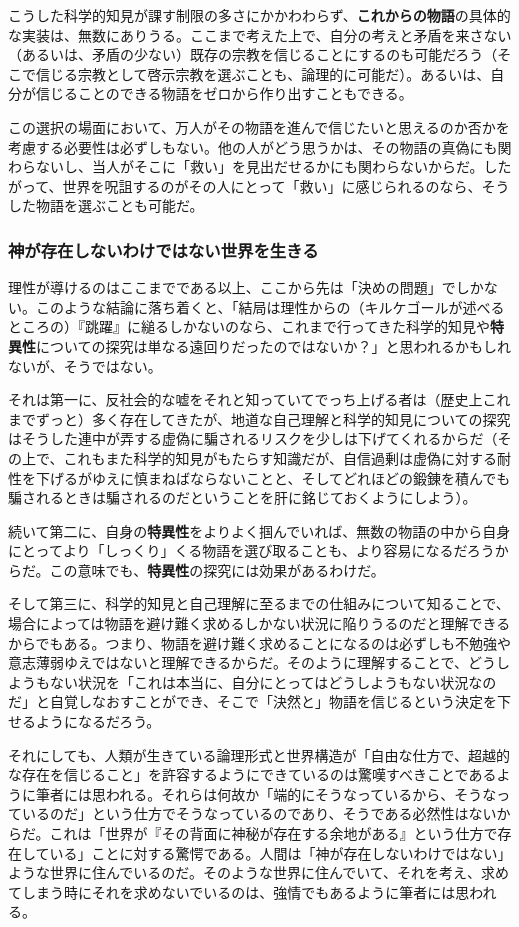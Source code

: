 こうした科学的知見が課す制限の多さにかかわわらず、\textbf{これからの物語}の具体的な実装は、無数にありうる。ここまで考えた上で、自分の考えと矛盾を来さない（あるいは、矛盾の少ない）既存の宗教を信じることにするのも可能だろう（そこで信じる宗教として啓示宗教を選ぶことも、論理的に可能だ）。あるいは、自分が信じることのできる物語をゼロから作り出すこともできる。

この選択の場面において、万人がその物語を進んで信じたいと思えるのか否かを考慮する必要性は必ずしもない。他の人がどう思うかは、その物語の真偽にも関わらないし、当人がそこに「救い」を見出だせるかにも関わらないからだ。したがって、世界を呪詛するのがその人にとって「救い」に感じられるのなら、そうした物語を選ぶことも可能だ。

\subsubsection{神が存在しないわけではない世界を生きる}\label{ux795eux304cux5b58ux5728ux3057ux306aux3044ux308fux3051ux3067ux306fux306aux3044ux4e16ux754cux3092ux751fux304dux308b}

理性が導けるのはここまでである以上、ここから先は「決めの問題」でしかない。このような結論に落ち着くと、「結局は理性からの（キルケゴールが述べるところの）『跳躍』に縋るしかないのなら、これまで行ってきた科学的知見や\textbf{特異性}についての探究は単なる遠回りだったのではないか？」と思われるかもしれないが、そうではない。

それは第一に、反社会的な嘘をそれと知っていてでっち上げる者は（歴史上これまでずっと）多く存在してきたが、地道な自己理解と科学的知見についての探究はそうした連中が弄する虚偽に騙されるリスクを少しは下げてくれるからだ（その上で、これもまた科学的知見がもたらす知識だが、自信過剰は虚偽に対する耐性を下げるがゆえに慎まねばならないことと、そしてどれほどの鍛錬を積んでも騙されるときは騙されるのだということを肝に銘じておくようにしよう）。

続いて第二に、自身の\textbf{特異性}をよりよく掴んでいれば、無数の物語の中から自身にとってより「しっくり」くる物語を選び取ることも、より容易になるだろうからだ。この意味でも、\textbf{特異性}の探究には効果があるわけだ。

そして第三に、科学的知見と自己理解に至るまでの仕組みについて知ることで、場合によっては物語を避け難く求めるしかない状況に陥りうるのだと理解できるからでもある。つまり、物語を避け難く求めることになるのは必ずしも不勉強や意志薄弱ゆえではないと理解できるからだ。そのように理解することで、どうしようもない状況を「これは本当に、自分にとってはどうしようもない状況なのだ」と自覚しなおすことができ、そこで「決然と」物語を信じるという決定を下せるようになるだろう。

それにしても、人類が生きている論理形式と世界構造が「自由な仕方で、超越的な存在を信じること」を許容するようにできているのは驚嘆すべきことであるように筆者には思われる。それらは何故か「端的にそうなっているから、そうなっているのだ」という仕方でそうなっているのであり、そうである必然性はないからだ。これは「世界が『その背面に神秘が存在する余地がある』という仕方で存在している」ことに対する驚愕である。人間は「神が存在しないわけではない」ような世界に住んでいるのだ。そのような世界に住んでいて、それを考え、求めてしまう時にそれを求めないでいるのは、強情でもあるように筆者には思われる。
